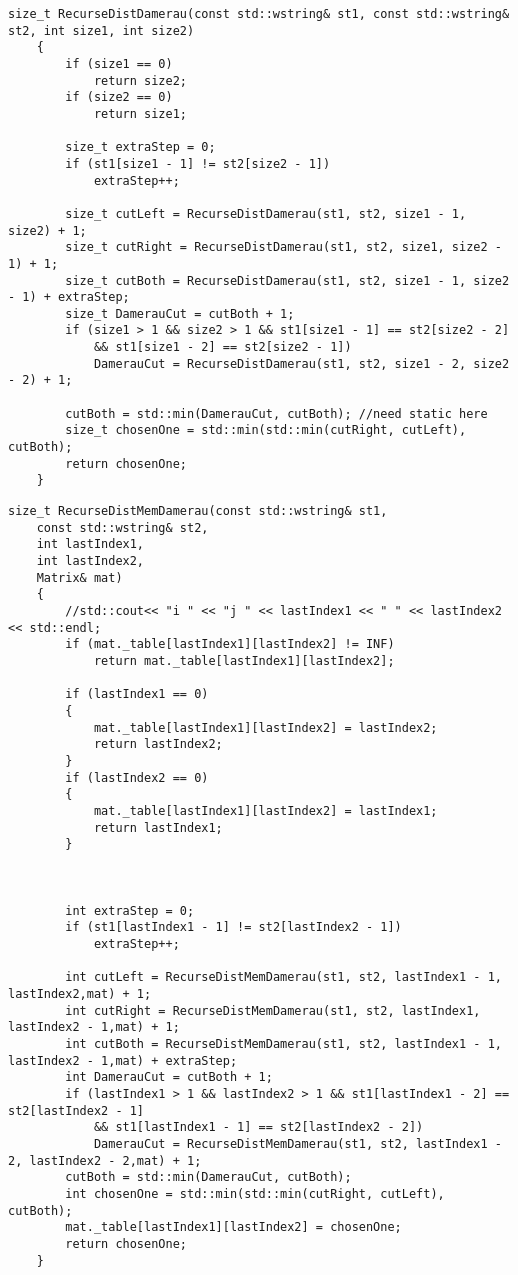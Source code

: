 \begin{lstlisting}[label=lst:damer_rec,caption=Функция нахождения расстояния Дамерау---Левенштейна с использованием рекурсии]
    size_t RecurseDistDamerau(const std::wstring& st1, const std::wstring& st2, int size1, int size2)
    {
        if (size1 == 0)
            return size2;
        if (size2 == 0)
            return size1;
    
        size_t extraStep = 0;
        if (st1[size1 - 1] != st2[size2 - 1])
            extraStep++;
    
        size_t cutLeft = RecurseDistDamerau(st1, st2, size1 - 1, size2) + 1;
        size_t cutRight = RecurseDistDamerau(st1, st2, size1, size2 - 1) + 1;
        size_t cutBoth = RecurseDistDamerau(st1, st2, size1 - 1, size2 - 1) + extraStep;
        size_t DamerauCut = cutBoth + 1;
        if (size1 > 1 && size2 > 1 && st1[size1 - 1] == st2[size2 - 2]
            && st1[size1 - 2] == st2[size2 - 1])
            DamerauCut = RecurseDistDamerau(st1, st2, size1 - 2, size2 - 2) + 1;
    
        cutBoth = std::min(DamerauCut, cutBoth); //need static here
        size_t chosenOne = std::min(std::min(cutRight, cutLeft), cutBoth);
        return chosenOne;
    }
\end{lstlisting}

\begin{lstlisting}[label=lst:damer_rec_mem,caption=Функция нахождения расстояния Дамерау---Левенштейна с использованием рекурсии c мемоизацией]
    size_t RecurseDistMemDamerau(const std::wstring& st1,
	const std::wstring& st2,
	int lastIndex1,
	int lastIndex2,
	Matrix& mat)
    {
        //std::cout<< "i " << "j " << lastIndex1 << " " << lastIndex2 << std::endl;
        if (mat._table[lastIndex1][lastIndex2] != INF)
            return mat._table[lastIndex1][lastIndex2];

        if (lastIndex1 == 0)
        {
            mat._table[lastIndex1][lastIndex2] = lastIndex2;
            return lastIndex2;
        }
        if (lastIndex2 == 0)
        {
            mat._table[lastIndex1][lastIndex2] = lastIndex1;
            return lastIndex1;
        }



        int extraStep = 0;
        if (st1[lastIndex1 - 1] != st2[lastIndex2 - 1])
            extraStep++;

        int cutLeft = RecurseDistMemDamerau(st1, st2, lastIndex1 - 1, lastIndex2,mat) + 1;
        int cutRight = RecurseDistMemDamerau(st1, st2, lastIndex1, lastIndex2 - 1,mat) + 1;
        int cutBoth = RecurseDistMemDamerau(st1, st2, lastIndex1 - 1, lastIndex2 - 1,mat) + extraStep;
        int DamerauCut = cutBoth + 1;
        if (lastIndex1 > 1 && lastIndex2 > 1 && st1[lastIndex1 - 2] == st2[lastIndex2 - 1]
            && st1[lastIndex1 - 1] == st2[lastIndex2 - 2])
            DamerauCut = RecurseDistMemDamerau(st1, st2, lastIndex1 - 2, lastIndex2 - 2,mat) + 1;
        cutBoth = std::min(DamerauCut, cutBoth);
        int chosenOne = std::min(std::min(cutRight, cutLeft), cutBoth);
        mat._table[lastIndex1][lastIndex2] = chosenOne;
        return chosenOne;
    }
\end{lstlisting}

